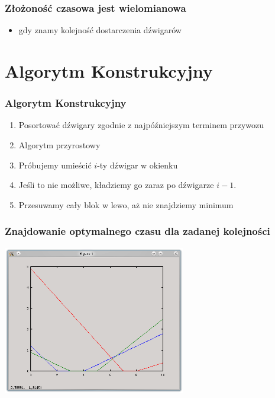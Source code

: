 \documentclass{beamer}
\begin{document}
\begin{frame}
 \frametitle{Złożoność czasowa jest wielomianowa}
 \begin{itemize}
  \item gdy znamy kolejność dostarczenia dźwigarów
 \end{itemize}
 

\end{frame}




\section{Algorytm Konstrukcyjny}

\begin{frame}

\frametitle{Algorytm Konstrukcyjny}

\begin{enumerate}
 \item Posortować dźwigary zgodnie z najpóźniejszym terminem przywozu
 \item Algorytm przyrostowy
 \item Próbujemy umieścić $i$-ty dźwigar w okienku
 \item Jeśli to nie możliwe, kładziemy go zaraz po dźwigarze $i-1$.
 \item Przesuwamy cały blok w lewo, aż nie znajdziemy minimum

\end{enumerate}

\end{frame}

 \begin{frame}
 \frametitle{ Znajdowanie optymalnego czasu dla zadanej kolejności}
 \begin{center}
  \includegraphics[width=8cm]{Grafika/wykres1.png}
 \end{center}
 \end{frame}
 
\end{document}
